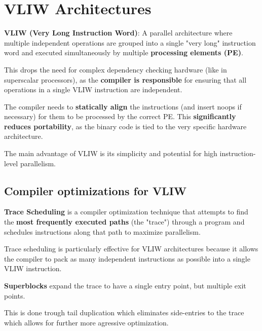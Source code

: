 \section{VLIW Architectures}

\begin{definition}
    \textbf{VLIW (Very Long Instruction Word)}: A parallel architecture where multiple independent operations are grouped into a single "very long" instruction word and executed simultaneously by multiple \textbf{processing elements (PE)}.
\end{definition}

\begin{remark}
    This drops the need for complex dependency checking hardware (like in superscalar processors), as the \textbf{compiler is responsible} for ensuring that all operations in a single VLIW instruction are independent.
\end{remark}

\begin{important}
    The compiler needs to \textbf{statically align} the instructions (and insert noops if necessary) for them to be processed by the correct PE. This \textbf{significantly reduces portability}, as the binary code is tied to the very specific hardware architecture.
\end{important}

\begin{remark}
    The main advantage of VLIW is its simplicity and potential for high instruction-level parallelism.
\end{remark}

\subsection{Compiler optimizations for VLIW}

\begin{definition}
    \textbf{Trace Scheduling} is a compiler optimization technique that attempts to find the \textbf{most frequently executed paths} (the "trace") through a program and schedules instructions along that path to maximize parallelism.
\end{definition}

\begin{remark}
    Trace scheduling is particularly effective for VLIW architectures because it allows the compiler to pack as many independent instructions as possible into a single VLIW instruction.
\end{remark}

\begin{definition}
    \textbf{Superblocks} expand the trace to have a single entry point, but multiple exit points. 
\end{definition}

\begin{remark}
    This is done trough tail duplication which eliminates side-entries to the trace which allows for further more agressive optimization.
\end{remark}